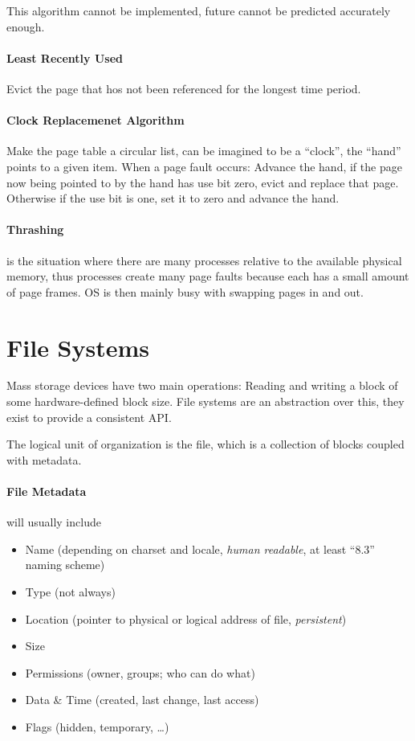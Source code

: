 \documentclass{article}
\begin{document}
\begin{multicols}{1}
This algorithm cannot be implemented, future cannot be predicted accurately enough.

\paragraph{Least Recently Used} Evict the page that hos not been referenced for the longest time period.

\paragraph{Clock Replacemenet Algorithm} Make the page table a circular list, can be imagined to be a \enquote{clock}, the \enquote{hand} points to a given item. When a page fault occurs: Advance the hand, if the page now being pointed to by the hand has use bit zero, evict and replace that page. Otherwise if the use bit is one, set it to zero and advance the hand.

\paragraph{Thrashing} is the situation where there are many processes relative to the available physical memory, thus processes create many page faults because each has a small amount of page frames. OS is then mainly busy with swapping pages in and out.

\section*{File Systems}

Mass storage devices have two main operations: Reading and writing a block of some hardware-defined block size. File systems are an abstraction over this, they exist to provide a consistent API.

The logical unit of organization is the file, which is a collection of blocks coupled with metadata.

\paragraph{File Metadata} will usually include
\begin{itemize}
    \item Name (depending on charset and locale, \emph{human readable}, at least \enquote{8.3} naming scheme)
    \item Type (not always)
    \item Location (pointer to physical or logical address of file, \emph{persistent})
    \item Size
    \item Permissions (owner, groups; who can do what)
    \item Data \& Time (created, last change, last access)
    \item Flags (hidden, temporary, \ldots)
\end{itemize}


\end{multicols}
\end{document}
